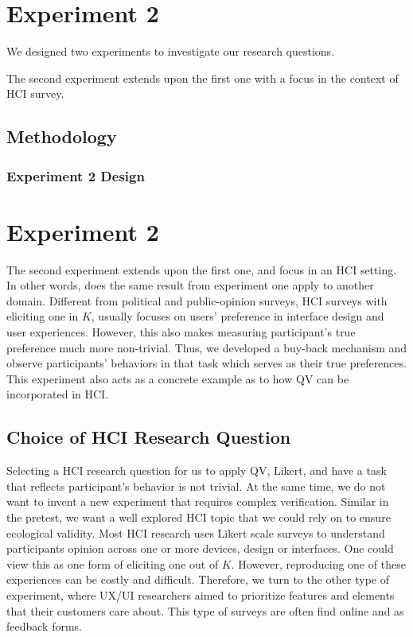 \section{Experiment 2}

We designed two experiments to investigate our research questions.

The second experiment extends upon the first one with a focus
in the context of HCI survey.\par


\subsection{Methodology} \label{method-2}

\subsubsection{Experiment 2 Design}

\section{Experiment 2}
The second experiment 
extends upon the first one,
and focus in an HCI setting.
In other words, 
does the same result from experiment one
apply to another domain.
Different from political and public-opinion surveys, 
HCI surveys with eliciting one in $K$,
usually focuses on users' preference 
in interface design and user experiences.
However, this also makes measuring 
participant's true preference
much more non-trivial.
Thus, we developed a buy-back mechanism 
and observe participants' behaviors in that task
which serves as their true preferences.
This experiment also acts 
as a concrete example as to how 
QV can be incorporated in HCI.

\subsection{Choice of HCI Research Question}
Selecting a HCI research question
for us to apply QV, Likert, and 
have a task that reflects participant's behavior
is not trivial. 
At the same time, 
we do not want to invent a new experiment 
that requires complex verification.
Similar in the pretest,
we want a well explored HCI topic 
that we could rely on
to ensure ecological validity.
Most HCI research uses Likert scale surveys
to understand participants opinion
across one or more devices, design or interfaces.
One could view this as one form of eliciting one
out of $K$. 
However, reproducing one of these experiences
can be costly and difficult.
Therefore, we turn to the other type of experiment,
where UX/UI researchers aimed to prioritize
features and elements that their customers care about.
This type of surveys are often find online
and as feedback forms.

